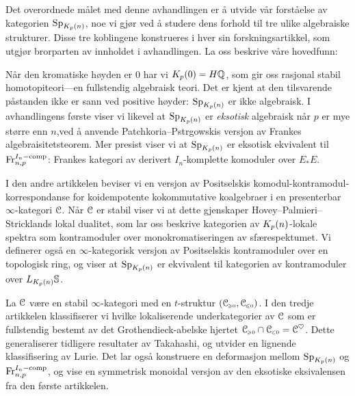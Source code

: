 Det overordnede målet med denne avhandlingen er å utvide vår forståelse av kategorien $\mathrm{Sp}_{K_p(n)}$, noe vi gjør ved å studere dens forhold til tre ulike algebraiske strukturer. Disse tre koblingene konstrueres i hver sin forskningsartikkel, som utgjør brorparten av innholdet i avhandlingen. La oss beskrive våre hovedfunn: 

Når den kromatiske høyden er $0$ har vi $K_p(0) = H\mathbb{Q}$, som gir oss rasjonal stabil homotopiteori---en fullstendig algebraisk teori. Det er kjent at den tilsvarende påstanden ikke er sann ved positive høyder: $\mathrm{Sp}_{K_p(n)}$ er ikke algebraisk. I avhandlingens første viser vi likevel at $\mathrm{Sp}_{K_p(n)}$ er \emph{eksotisk} algebraisk når $p$ er mye større enn $n$,ved å anvende Patchkoria--Pstr\a{}gowskis versjon av Frankes algebraisitetsteorem. Mer presist viser vi at $\mathrm{Sp}_{K_p(n)}$ er eksotisk ekvivalent til $\mathrm{Fr}_{n,p}^{I_n-\mathrm{comp}}$: Frankes kategori av derivert $I_n$-komplette komoduler over $E_*E$. 

I den andre artikkelen beviser vi en versjon av Positselskis komodul-kontramodul-korrespondanse for koidempotente kokommutative koalgebraer i en presenterbar $\infty$-kategori $\EuScript{C}$. Når $\EuScript{C}$ er stabil viser vi at dette gjenskaper Hovey--Palmieri--Stricklands lokal dualitet, som lar oss beskrive kategorien av ${K_p(n)}$-lokale spektra som kontramoduler over monokromatiseringen av sfærespektumet. Vi definerer også en $\infty$-kategorisk versjon av Positselskis kontramoduler over en topologisk ring, og viser at $\mathrm{Sp}_{K_p(n)}$ er ekvivalent til kategorien av kontramoduler over $L_{K_p(n)} \mathbb{S}$. 

La $\EuScript{C}$ være en stabil $\infty$-kategori med en $t$-struktur $(\EuScript{C}_{\hspace{-1pt}\scriptscriptstyle\geqslant 0}, \EuScript{C}_{\hspace{-1pt}\scriptscriptstyle\leqslant 0})$. I den tredje artikkelen klassifiserer vi hvilke lokaliserende underkategorier av $\EuScript{C}$ som er fullstendig bestemt av det Grothendieck-abelske hjertet $\EuScript{C}_{\hspace{-1pt}\scriptscriptstyle\geqslant 0} \cap \EuScript{C}_{\hspace{-1pt}\scriptscriptstyle\leqslant 0} = \EuScript{C}^\heartsuit$. Dette generaliserer tidligere resultater av Takahashi, og utvider en lignende klassifisering av Lurie. Det lar også konstruere en deformasjon mellom $\mathrm{Sp}_{K_p(n)}$ og $\mathrm{Fr}_{n,p}^{I_n-\mathrm{comp}}$, og vise en symmetrisk monoidal versjon av den eksotiske eksivalensen fra den første artikkelen. 



